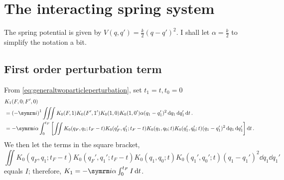 \section{The interacting spring system}

The spring potential is given by $V(q, q') = \frac{k}{2}(q - q')^2$. I shall let $\alpha = \frac{k}{2}$ to simplify the notation a bit.

\subsection{First order perturbation term}
\label{sec:spring_1storder}

From \cref{eq:generaltwoparticleperturbation}, set $t_1 = t, t_0 = 0$
\begin{align}
    &K_1(F, 0; F', 0) \nonumber \\
    &= \left(-\im\right)^1\iiint K_0(F, 1)K_0(F', 1')K_0(1, 0)K_0(1, 0')\alpha(q_1 - q_1')^2\dd{q_1}\dd{q_1'}\dd{t}. \\
    &= -\im\alpha\int_0^{t_F}\left[\iint K_0(q_F, q_1; t_F - t)K_0(q_F', q_1'; t_F - t)K_0(q_1, q_0; t)K_0(q_1', q_0'; t)(q_1 - q_1')^2\dd{q_1}\dd{q_1'}\right]\dd{t}. \nonumber
\end{align}
We then let the terms in the square bracket,
\begin{equation}
    \iint K_0(q_F, q_1; t_F - t)K_0(q_F', q_1'; t_F - t)K_0(q_1, q_0; t)K_0(q_1', q_0'; t)(q_1 - q_1')^2\dd{q_1}\dd{q_1'}
\end{equation}
equals $I$; therefore, $K_1 = -\im\alpha\int_0^{t_F} I\dd{t}$.

